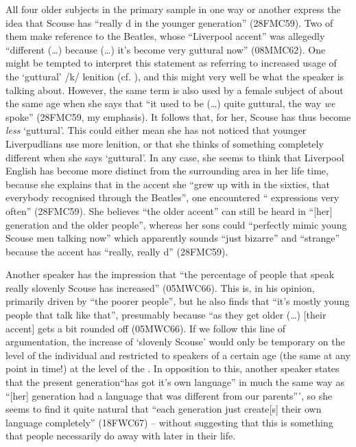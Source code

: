 All four older subjects in the primary sample in one way or another express the idea that Scouse has ``really d in the younger generation'' (28FMC59).
Two of them make reference to the Beatles, whose ``Liverpool accent'' was allegedly ``different (\ldots) because (\ldots) it's become very guttural now'' (08MMC62).
One might be tempted to interpret this statement as referring to increased usage of the `guttural' /k/ lenition (cf. ), and this might very well be what the speaker is talking about.
However, the same term is also used by a female subject of about the same age when she says that ``it used to be (\ldots) quite guttural, the way \emph{we} spoke'' (28FMC59, my emphasis).
It follows that, for her, Scouse has thus become \emph{less} `guttural'.
This could either mean she has not noticed that younger Liverpudlians use more lenition, or that she thinks of something completely different when she says `guttural'.
In any case, she seems to think that Liverpool English has become more distinct from the surrounding area in her life time, because she explains that in the accent she ``grew up with in the sixties, that everybody recognised through the Beatles'', one encountered `` expressions very often'' (28FMC59).
She believes ``the older accent'' can still be heard in ``[her] generation and the older people'', whereas her sons could ``perfectly mimic young Scouse men talking now'' which apparently sounds ``just bizarre'' and ``strange'' because the accent has ``really, really d'' (28FMC59).

Another speaker has the impression that ``the percentage of people that speak really slovenly Scouse has increased'' (05MWC66).
This  is, in his opinion, primarily driven by ``the poorer people'', but he also finds that ``it's mostly young people that talk like that'', presumably because ``as they get older (\ldots) [their accent] gets a bit rounded off (05MWC66).
If we follow this line of argumentation, the increase of `slovenly Scouse' would only be temporary on the level of the individual and restricted to speakers of a certain age (the same at any point in time!) at the level of the .
In opposition to this, another speaker states that the present generation``has got it's own language'' in much the same way as ``[her] generation had a language that was different from our parents''', so she seems to find it quite natural that ``each generation just create[s] their own language completely'' (18FWC67) -- without suggesting that this is something that people necessarily do away with later in their life.

